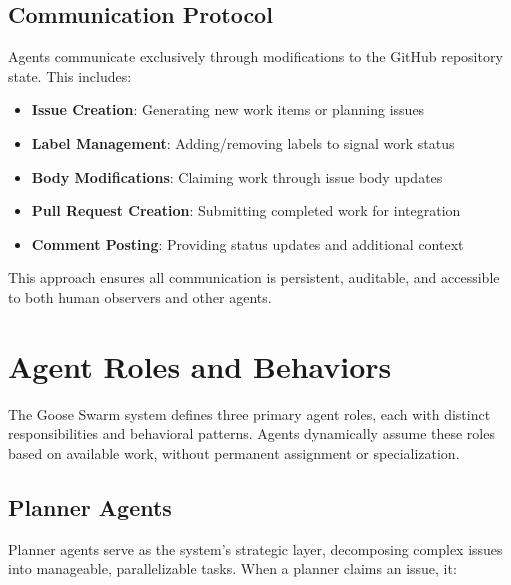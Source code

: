 \documentclass[11pt,a4paper]{article}
\begin{document}
\subsection{Communication Protocol}

Agents communicate exclusively through modifications to the GitHub repository state. This includes:

\begin{itemize}
    \item \textbf{Issue Creation}: Generating new work items or planning issues
    \item \textbf{Label Management}: Adding/removing labels to signal work status
    \item \textbf{Body Modifications}: Claiming work through issue body updates
    \item \textbf{Pull Request Creation}: Submitting completed work for integration
    \item \textbf{Comment Posting}: Providing status updates and additional context
\end{itemize}

This approach ensures all communication is persistent, auditable, and accessible to both human observers and other agents.

\section{Agent Roles and Behaviors}

The Goose Swarm system defines three primary agent roles, each with distinct responsibilities and behavioral patterns. Agents dynamically assume these roles based on available work, without permanent assignment or specialization.

\subsection{Planner Agents}

Planner agents serve as the system's strategic layer, decomposing complex issues into manageable, parallelizable tasks. When a planner claims an issue, it:
\end{document}
